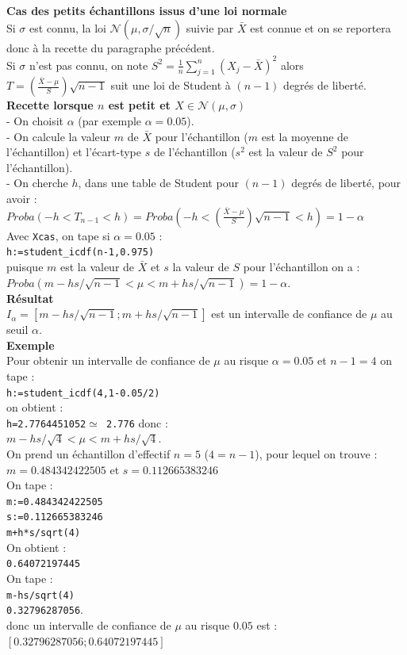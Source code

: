 \documentclass[a4paper,11pt]{book}
\begin{document}
{\bf Cas des petits \'echantillons issus d'une loi normale}\\
Si $\sigma$ est connu, la loi $\mathcal N(\mu,\sigma/\sqrt{n})$ suivie par 
$\bar X$ est connue et on se reportera donc \`a la recette du paragraphe 
pr\'ec\'edent.\\
Si $\sigma$ n'est pas connu, on note 
$S^2=\frac{1}{n}\sum_{j=1}^n(X_j-\bar X)^2$ alors\\
 $T=(\frac{\bar X-\mu}{S})\sqrt{n-1}$ suit une loi de Student \`a $(n-1)$ degr\'es de libert\'e.\\
 {\bf Recette lorsque $n$ est petit et $X \in \mathcal N(\mu,\sigma)$}\\
- On choisit $\alpha$ (par exemple $\alpha=0.05$).\\
- On calcule la valeur $m$ de $\bar X$ pour l'\'echantillon ($m$ est la moyenne
de l'\'echantillon) et l'\'ecart-type $s$ de l'\'echantillon ($s^2$ est la 
valeur de $S^2$ pour l'\'echantillon). \\
- On cherche $h$, dans une table de Student pour $(n-1)$ degr\'es de libert\'e,
 pour avoir :\\
$Proba(-h<T_{n-1}<h)=Proba(-h<(\frac{\bar X-\mu}{S})\sqrt{n-1}<h)=1-\alpha$ \\
Avec {\tt Xcas}, on tape   si $\alpha=0.05$ :\\
{\tt h:=student\_icdf(n-1,0.975)}\\
puisque $m$ est la valeur de $\bar X$ et $s$ la valeur de $S$ pour 
l'\'echantillon on a :\\ 
$Proba(m-hs/\sqrt{n-1}<\mu<m+hs/\sqrt{n-1})=1-\alpha$.\\
{\bf R\'esultat}\\
$I_{\alpha}=[m-hs/\sqrt{n-1};m+hs/\sqrt{n-1}]$ est un intervalle de confiance 
de $\mu$ au seuil $\alpha$.\\
{\bf Exemple}\\
Pour obtenir un intervalle de confiance de $\mu$ au risque $\alpha=0.05$ et 
$ n-1=4$ on tape :\\
{\tt h:=student\_icdf(4,1-0.05/2)}\\
on obtient :\\
{\tt h=2.7764451052$\simeq$ 2.776} donc :\\
$  m-hs/\sqrt4<\mu< m+hs/\sqrt 4$.\\
On prend un \'echantillon d'effectif $n=5$ ($4=n-1$), pour lequel on trouve :\\
$ m=0.484342422505 $ et 
$s=0.112665383246$\\
On tape :\\
{\tt m:=0.484342422505}\\
{\tt s:=0.112665383246}\\
{\tt  m+h*s/sqrt(4)}\\
On obtient :\\
{\tt 0.64072197445}\\
On tape :\\
{\tt  m-hs/sqrt(4)}\\
{\tt 0.32796287056}.\\
donc un intervalle de confiance de $\mu$ au risque $0.05$ est :\\
$[0.32796287056; 0.64072197445]$
\end{document}
